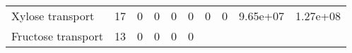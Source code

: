 \documentclass[]{article}
\begin{document}
\begin{longtable}[]{@{}lccccccccc@{}}
\begin{minipage}[t]{0.07\columnwidth}
Xylose transport\strut
\end{minipage} & \begin{minipage}[t]{0.06\columnwidth}\centering\strut
17\strut
\end{minipage} & \begin{minipage}[t]{0.08\columnwidth}\centering\strut
0\strut
\end{minipage} & \begin{minipage}[t]{0.08\columnwidth}\centering\strut
0\strut
\end{minipage} & \begin{minipage}[t]{0.08\columnwidth}\centering\strut
0\strut
\end{minipage} & \begin{minipage}[t]{0.08\columnwidth}\centering\strut
0\strut
\end{minipage} & \begin{minipage}[t]{0.08\columnwidth}\centering\strut
0\strut
\end{minipage} & \begin{minipage}[t]{0.08\columnwidth}\centering\strut
0\strut
\end{minipage} & \begin{minipage}[t]{0.08\columnwidth}\centering\strut
9.65e+07\strut
\end{minipage} & \begin{minipage}[t]{0.08\columnwidth}\centering\strut
1.27e+08\strut
\end{minipage}\tabularnewline
\begin{minipage}[t]{0.07\columnwidth}\raggedright\strut
Fructose transport\strut
\end{minipage} & \begin{minipage}[t]{0.06\columnwidth}\centering\strut
13\strut
\end{minipage} & \begin{minipage}[t]{0.08\columnwidth}\centering\strut
0\strut
\end{minipage} & \begin{minipage}[t]{0.08\columnwidth}\centering\strut
0\strut
\end{minipage} & \begin{minipage}[t]{0.08\columnwidth}\centering\strut
0\strut
\end{minipage} & \begin{minipage}[t]{0.08\columnwidth}\centering\strut
0\strut
\end{minipage} & \begin{minipage}[t]{0.08\columnwidth}\centering\strut

\end{minipage}
\end{longtable}
\end{document}
